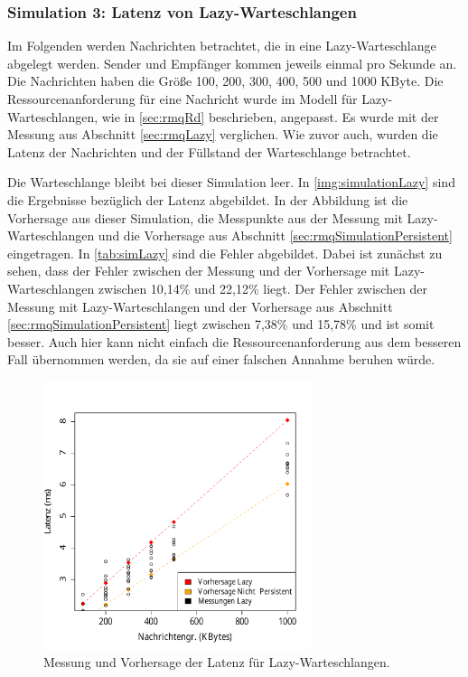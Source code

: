 \subsubsection{Simulation 3: Latenz von Lazy-Warteschlangen}
Im Folgenden werden Nachrichten betrachtet, die in eine Lazy-Warteschlange abgelegt werden. Sender und Empfänger kommen jeweils einmal pro Sekunde an. Die Nachrichten haben die Größe 100, 200, 300, 400, 500 und 1000 KByte. Die Ressourcenanforderung für eine Nachricht wurde im Modell für Lazy-Warteschlangen, wie in \autoref{sec:rmqRd} beschrieben, angepasst. Es wurde mit der Messung aus Abschnitt \ref{sec:rmqLazy} verglichen. Wie zuvor auch, wurden die Latenz der Nachrichten und der Füllstand der Warteschlange betrachtet. \par
Die Warteschlange bleibt bei dieser Simulation leer. In \autoref{img:simulationLazy} sind die Ergebnisse bezüglich der Latenz abgebildet. In der Abbildung ist die Vorhersage aus dieser Simulation, die Messpunkte aus der Messung mit Lazy-Warteschlangen und die Vorhersage aus Abschnitt \ref{sec:rmqSimulationPersistent} eingetragen. In \autoref{tab:simLazy} sind die Fehler abgebildet. Dabei ist zunächst zu sehen, dass der Fehler zwischen der Messung und der Vorhersage mit Lazy-Warteschlangen zwischen 10,14\% und 22,12\% liegt. Der Fehler zwischen der Messung mit Lazy-Warteschlangen und der Vorhersage aus Abschnitt \ref{sec:rmqSimulationPersistent} liegt zwischen 7,38\% und 15,78\% und ist somit besser. Auch hier kann nicht einfach die Ressourcenanforderung aus dem besseren Fall übernommen werden, da sie auf einer falschen Annahme beruhen würde.
\begin{figure}
\center
  \includegraphics[width=0.7\textwidth]{images/modelSimulationResults/simulation6.pdf}
  \caption{Messung und Vorhersage der Latenz für Lazy-Warteschlangen.}
  \label{img:simulationLazy}
\end{figure}

